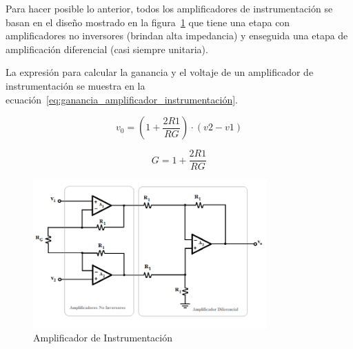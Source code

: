                 Para hacer posible lo anterior, todos los amplificadores de instrumentación se basan en el diseño mostrado en la figura~\ref{fig:Amplificador_Instrumentacion} que tiene una etapa con amplificadores no inversores (brindan alta impedancia) y enseguida una etapa de amplificación diferencial (casi siempre unitaria)\cite{Diaz_amplificacion_señales}.

                La expresión para calcular la ganancia y el voltaje de un amplificador de instrumentación se muestra en la ecuación~\ref{eq:ganancia_amplificador_instrumentación}.

                \begin{equation}
                    \label{eq:voltaje_amplificador_instrumentación}
                    v_0 = (1 + \frac{2R1}{RG}) \cdot (v2 - v1)
                \end{equation}

                \begin{equation}
                    \label{eq:ganancia_amplificador_instrumentación}
                    G = 1 + \frac{2R1}{RG}
                \end{equation}

                \begin{figure} [H]
                    \centering
                    \includegraphics[width=0.8\textwidth]{img/Desarrollo/Amplificador_Intrumentacion.png}
                    \caption[Amplificador de Instrumentación]{Amplificador de Instrumentación\footnotemark}
                    \label{fig:Amplificador_Instrumentacion}
                \end{figure}

